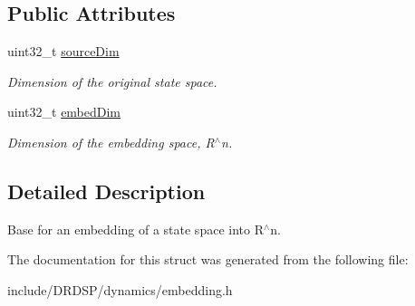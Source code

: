 \subsection*{Public Attributes}
\begin{DoxyCompactItemize}
\item 
\hypertarget{struct_d_r_d_s_p_1_1_embedding_a31e1f302b771269d2475538dc0d12e26}{uint32\-\_\-t \hyperlink{struct_d_r_d_s_p_1_1_embedding_a31e1f302b771269d2475538dc0d12e26}{source\-Dim}}\label{struct_d_r_d_s_p_1_1_embedding_a31e1f302b771269d2475538dc0d12e26}

\begin{DoxyCompactList}\small\item\em Dimension of the original state space. \end{DoxyCompactList}\item 
\hypertarget{struct_d_r_d_s_p_1_1_embedding_a43679793e6c6df0de8a564c97b774928}{uint32\-\_\-t \hyperlink{struct_d_r_d_s_p_1_1_embedding_a43679793e6c6df0de8a564c97b774928}{embed\-Dim}}\label{struct_d_r_d_s_p_1_1_embedding_a43679793e6c6df0de8a564c97b774928}

\begin{DoxyCompactList}\small\item\em Dimension of the embedding space, R$^\wedge$n. \end{DoxyCompactList}\end{DoxyCompactItemize}


\subsection{Detailed Description}
Base for an embedding of a state space into R$^\wedge$n. 

The documentation for this struct was generated from the following file\-:\begin{DoxyCompactItemize}
\item 
include/\-D\-R\-D\-S\-P/dynamics/embedding.\-h\end{DoxyCompactItemize}
